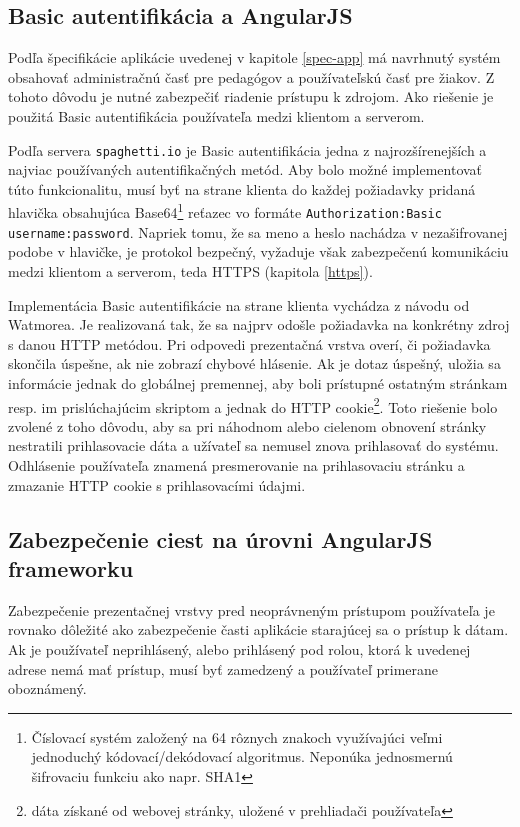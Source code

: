 \documentclass[12pt,oneside]{fithesis2}
\begin{document}
      		\subsection{Basic autentifikácia a AngularJS}
      		\par Podľa špecifikácie aplikácie uvedenej v kapitole \ref{spec-app} má navrhnutý systém obsahovať administračnú časť pre pedagógov a používateľskú časť pre žiakov. Z tohoto dôvodu je nutné zabezpečiť riadenie prístupu k zdrojom. Ako riešenie je použitá Basic autentifikácia používateľa medzi klientom a serverom.
      		\par Podľa servera \texttt{spaghetti.io}\cite{spaghetti14} je Basic autentifikácia jedna z najrozšírenejších a najviac používaných autentifikačných metód. Aby bolo možné implementovať túto funkcionalitu, musí byť na strane klienta do každej požiadavky pridaná hlavička obsahujúca Base64\footnote{Číslovací systém založený na 64 rôznych znakoch využívajúci veľmi jednoduchý kódovací/dekódovací algoritmus. Neponúka jednosmernú šifrovaciu funkciu ako napr. SHA1} reťazec vo formáte \texttt{Authorization:Basic username:password}. Napriek tomu, že sa meno a heslo nachádza v nezašifrovanej podobe v hlavičke, je protokol bezpečný, vyžaduje však zabezpečenú komunikáciu medzi klientom a serverom, teda HTTPS (kapitola \ref{https}). 
      		\par Implementácia Basic autentifikácie na strane klienta vychádza z návodu od Watmorea\cite{watmore14}. Je realizovaná tak, že sa najprv odošle požiadavka na konkrétny zdroj s danou HTTP metódou. Pri odpovedi prezentačná vrstva overí, či požiadavka skončila úspešne, ak nie zobrazí chybové hlásenie. Ak je dotaz úspešný, uložia sa informácie jednak do globálnej premennej, aby boli prístupné ostatným stránkam resp. im prislúchajúcim skriptom a jednak do HTTP cookie\footnote{dáta získané od webovej stránky, uložené v prehliadači používateľa}. Toto riešenie bolo zvolené z toho dôvodu, aby sa pri náhodnom alebo cielenom obnovení stránky nestratili prihlasovacie dáta a užívateľ sa nemusel znova prihlasovať do systému. Odhlásenie používateľa znamená presmerovanie na prihlasovaciu stránku a zmazanie HTTP cookie s prihlasovacími údajmi.
      		
      		\subsection{Zabezpečenie ciest na úrovni AngularJS frameworku}
      		\par Zabezpečenie prezentačnej vrstvy pred neoprávneným prístupom používateľa je rovnako dôležité ako zabezpečenie časti aplikácie starajúcej sa o prístup k dátam. Ak je používateľ neprihlásený, alebo prihlásený pod rolou, ktorá k uvedenej adrese nemá mať prístup, musí byť zamedzený a používateľ primerane oboznámený.
      		\par 
      		
\end{document}

